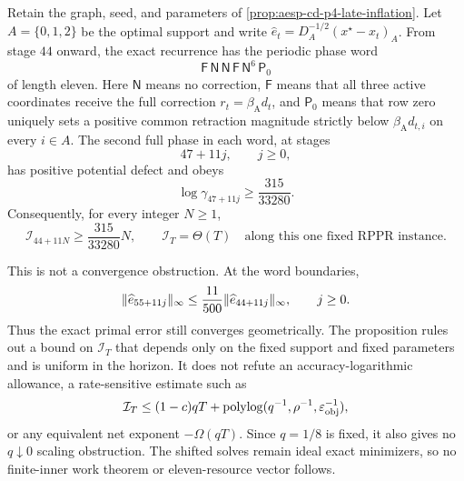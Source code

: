\begin{proposition}
\label{prop:aesp-cd-p4-infinite-inflation}
Retain the graph, seed, and parameters of
\cref{prop:aesp-cd-p4-late-inflation}.  Let
$A=\{0,1,2\}$ be the optimal support and write
$\widehat e_t=D_A^{-1/2}(x^\star-x_t)_A$.  From stage $44$ onward, the
exact recurrence has the periodic phase word
\begin{equation}
 \mathsf F\,\mathsf N\,\mathsf N\,\mathsf F\,
 \mathsf N^6\,\mathsf P_0
 \label{eq:aesp-cd-p4-infinite-word}
\end{equation}
of length eleven.  Here $\mathsf N$ means no correction, $\mathsf F$ means
that all three active coordinates receive the full correction
$r_t=\beta_{\mathrm A}d_t$, and $\mathsf P_0$ means that row zero uniquely
sets a positive common retraction magnitude strictly below
$\beta_{\mathrm A}d_{t,i}$ on every $i\in A$.  The second full phase in each
word, at stages
\begin{equation}
 47+11j,\qquad j\geq0,
 \label{eq:aesp-cd-p4-infinite-positive-stages}
\end{equation}
has positive potential defect and obeys
\begin{equation}
 \log\gamma_{47+11j}\geq\frac{315}{33280}.
 \label{eq:aesp-cd-p4-infinite-gamma-floor}
\end{equation}
Consequently, for every integer $N\geq1$,
\begin{equation}
 \mathcal I_{44+11N}\geq\frac{315}{33280}N,
 \qquad
 \mathcal I_T=\Theta(T)
 \quad\text{along this one fixed RPPR instance.}
 \label{eq:aesp-cd-p4-infinite-inflation-floor}
\end{equation}

This is not a convergence obstruction.  At the word boundaries,
\begin{equation}
 \lVert\widehat e_{55+11j}\rVert_\infty
 \leq\frac{11}{500}
       \lVert\widehat e_{44+11j}\rVert_\infty,
 \qquad j\geq0.
 \label{eq:aesp-cd-p4-infinite-error-contraction}
\end{equation}
Thus the exact primal error still converges geometrically.  The proposition
rules out a bound on $\mathcal I_T$ that depends only on the fixed support and
fixed parameters and is uniform in the horizon.  It does not refute an
accuracy-logarithmic allowance, a rate-sensitive estimate such as
\begin{equation}
 \mathcal I_T\leq(1-c)qT+\operatorname{polylog}
        (q^{-1},\rho^{-1},\varepsilon_{\mathrm{obj}}^{-1}),
 \label{eq:aesp-cd-net-packing-target}
\end{equation}
or any equivalent net exponent $-\Omega(qT)$.  Since $q=1/8$ is fixed, it
also gives no $q\downarrow0$ scaling obstruction.  The shifted solves remain
ideal exact minimizers, so no finite-inner work theorem or eleven-resource
vector follows.
\end{proposition}

